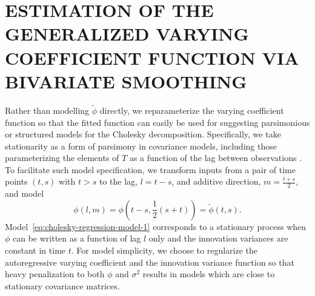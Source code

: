 \documentclass[12pt]{article}
\begin{document}
\section*{\sffamily \large  ESTIMATION OF THE GENERALIZED VARYING COEFFICIENT FUNCTION VIA BIVARIATE SMOOTHING}

Rather than modelling $\tilde{\phi}$ directly, we reparameterize the varying coefficient function so that the fitted function can easily be used for suggesting parsimonious or structured models for the Cholesky decomposition. Specifically, we take stationarity as a form of parsimony in covariance models, including those parameterizing the elements of $T$ as a function of the lag between observations \cite{leng2010semiparametric,pan2003modelling,pourahmadi1999joint,pourahmadi2002dynamic}. To facilitate such model specification, we transform inputs from a pair of time points $(t,s)$ with $t>s$ to the lag, $l = t - s$, and additive direction, $m = \frac{t + s}{2}$, and model
\begin{equation} \label{eq:phi-to-tilde-phi} 
\phi\left(l,m\right) = {\phi}\left(t-s, \frac{1}{2}\left(s+t\right)\right) = \tilde{\phi}\left(t,s\right).
\end{equation}
\noindent
Model~\eqref{eq:cholesky-regression-model-1} corresponds to a stationary process when $\phi$ can be written as a function of lag $l$ only and the innovation variances are constant in time $t$. For model simplicity, we choose to regularize the autoregressive varying coefficient and the innovation variance function so that heavy penalization to both $\phi$ and $\sigma^2$ results in models which are close to stationary covariance matrices. 
\end{document}
